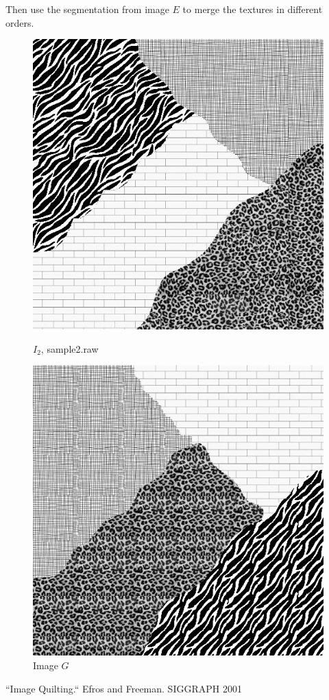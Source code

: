 \documentclass[12pt,a4paper,notitlepage,oneside,amsmath,amssymb]{article}
\begin{document}
\begin{CJK*}{UTF8}{bkai}
\begin{enumerate}[label=(\alph*)]
Then use the segmentation from image \(E\) to merge the textures in different orders.

\begin{figure}[hbt!]
	\centering
	\begin{minipage}{.35\textwidth}
		\centering
		\includegraphics[width=.7\linewidth]{sample2}
		\caption*{\(I_2\), sample2.raw}
	\end{minipage}%
	\begin{minipage}{.35\textwidth}
		\centering
		\includegraphics[width=.7\linewidth]{image_G}
		\caption*{Image \(G\)}
	\end{minipage}
\end{figure}

\end{enumerate}


\begin{thebibliography}{9}
``Image Quilting.`` Efros and Freeman. SIGGRAPH 2001
\end{thebibliography}

\clearpage

\end{CJK*}
\end{document}
